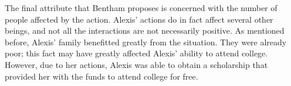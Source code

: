 \documentclass{paper}
\begin{document}
The final attribute that Bentham proposes is concerned with the number of people affected by the action. Alexis' actions do in fact affect several other beings, and not all the interactions are not necessarily positive. As mentioned before, Alexis' family benefitted greatly from the situation. They were already poor; this fact may have greatly affected Alexis' ability to attend college. However, due to her actions, Alexis was able to obtain a scholarship that provided her with the funds to attend college for free.

\newpage
\printbibliography
\end{document}
